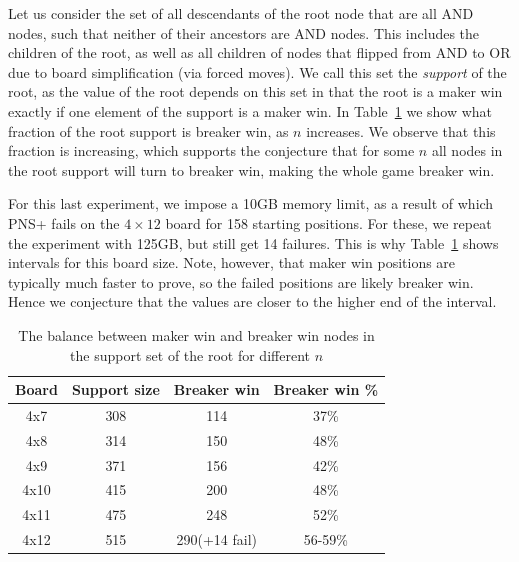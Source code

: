 \documentclass[conference]{IEEEtran}
\theoremstyle{definition}
\begin{document}
Let us consider the set of all descendants of the root node that are all AND nodes, such that neither of their ancestors are AND nodes. This includes the children of the root, as well as all children of nodes that flipped from AND to OR due to board simplification (via forced moves). We call this set the \emph{support} of the root, as the value of the root depends on this set in that the root is a maker win exactly if one element of the support is a maker win. In Table~\ref{tab:balance} we show what fraction of the root support is breaker win, as $n$ increases. We observe that this fraction is increasing, which supports the conjecture that for some $n$ all nodes in the root support will turn to breaker win, making the whole game breaker win. 

For this last experiment, we impose a 10GB memory limit, as a result of which PNS+ fails on the $4\times 12$ board for 158 starting positions. For these, we repeat the experiment with 125GB, but still get 14 failures. This is why Table~\ref{tab:balance} shows intervals for this board size. Note, however, that maker win positions are typically much faster to prove, so the failed positions are likely breaker win. Hence we conjecture that the values are closer to the higher end of the interval.

\begin{table}[htbp]
\caption{The balance between maker win and breaker win nodes in the support set of the root for different $n$}
\begin{center}
\begin{tabular}{ c | c c c }
\hline
\textbf{Board} & \textbf{Support size} & \textbf{Breaker win}  & \textbf{Breaker win \%}\\
\hline 
4x7 & 308 & 114 & 37\% \\
4x8 & 314 & 150 & 48\% \\
4x9 & 371 & 156 & 42\% \\
4x10 & 415  & 200 & 48\% \\
4x11 & 475  & 248 & 52\% \\
4x12 & 515  & 290(+14 fail) & 56-59\% \\
\hline
\end{tabular}
\label{tab:balance}
\end{center}
\vspace{-10pt}
\end{table}
\end{document}
